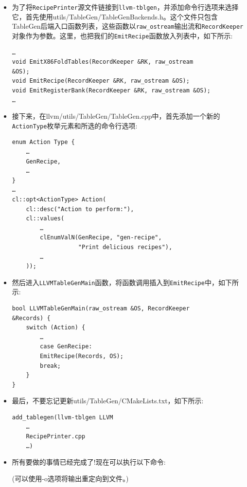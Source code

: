 \begin{itemize}
\item 为了将\texttt{RecipePrinter}源文件链接到\texttt{llvm-tblgen}，并添加命令行选项来选择它，首先使用utils/TableGen/TableGenBackends.h。这个文件只包含TableGen后端入口函数列表，这些函数以\texttt{raw\_ostream}输出流和\texttt{RecordKeeper}对象作为参数。这里，也把我们的\texttt{EmitRecipe}函数放入列表中，如下所示:

\begin{lstlisting}[style=styleCXX]
…
void EmitX86FoldTables(RecordKeeper &RK, raw_ostream
&OS);
void EmitRecipe(RecordKeeper &RK, raw_ostream &OS);
void EmitRegisterBank(RecordKeeper &RK, raw_ostream &OS);
…
\end{lstlisting}

\item 接下来，在llvm/utils/TableGen/TableGen.cpp中，首先添加一个新的\texttt{ActionType}枚举元素和所选的命令行选项:

\begin{lstlisting}[style=styleCXX]
enum Action Type {
	…
	GenRecipe,
	… 
} 
…
cl::opt<ActionType> Action(
	cl::desc("Action to perform:"),
	cl::values(
		…
		clEnumValN(GenRecipe, "gen-recipe",
				   "Print delicious recipes"),
		…
	));
\end{lstlisting}

\item 然后进入\texttt{LLVMTableGenMain}函数，将函数调用插入到\texttt{EmitRecipe}中，如下所示:

\begin{lstlisting}[style=styleCXX]
bool LLVMTableGenMain(raw_ostream &OS, RecordKeeper
&Records) {
	switch (Action) {
		…
		case GenRecipe:
		EmitRecipe(Records, OS);
		break;
	}
}
\end{lstlisting}

\item 最后，不要忘记更新utils/TableGen/CMakeLists.txt，如下所示:

\begin{lstlisting}[style=styleCXX]
add_tablegen(llvm-tblgen LLVM
	…
	RecipePrinter.cpp
	…)
\end{lstlisting}

\item 所有要做的事情已经完成了!现在可以执行以下命令:


(可以使用-o选项将输出重定向到文件。)


\end{itemize}
